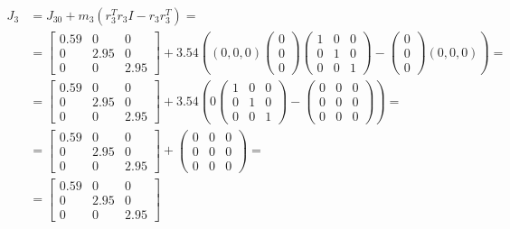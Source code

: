 \documentclass[a4paper]{article}
\begin{document}
	\begin{align*}
		J_3 &= J_{30} + m_3(r_3^Tr_3I-r_3r_3^T) =
		\\
		&= \begin{bmatrix}
			0.59 & 0 & 0 \\
			0 & 2.95 & 0 \\
			0 & 0 & 2.95
		\end{bmatrix} +
		3.54
		\left(
		(0, 0, 0)
		\begin{pmatrix}
			0 \\ 0 \\ 0
		\end{pmatrix}
		\begin{pmatrix}
			1 & 0 & 0 \\
			0 & 1 & 0 \\
			0 & 0 & 1
		\end{pmatrix}
		-
		\begin{pmatrix}
			0 \\ 0 \\ 0
		\end{pmatrix}
		(0, 0, 0)
		\right) =
		\\
		&= \begin{bmatrix}
			0.59 & 0 & 0 \\
			0 & 2.95 & 0 \\
			0 & 0 & 2.95
		\end{bmatrix} +
		3.54
		\left(
		0
		\begin{pmatrix}
			1 & 0 & 0 \\
			0 & 1 & 0 \\
			0 & 0 & 1
		\end{pmatrix}
		-
		\begin{pmatrix}
			0 & 0 & 0 \\
			0 & 0 & 0 \\
			0 & 0 & 0
		\end{pmatrix}
		\right) =
		\\
		&= \begin{bmatrix}
			0.59 & 0 & 0 \\
			0 & 2.95 & 0 \\
			0 & 0 & 2.95
		\end{bmatrix} +
		\begin{pmatrix}
			0 & 0 & 0 \\
			0 & 0 & 0 \\
			0 & 0 & 0
		\end{pmatrix}=
		\\
		&= \begin{bmatrix}
			0.59 & 0 & 0 \\
			0 & 2.95 & 0 \\
			0 & 0 & 2.95
		\end{bmatrix}
	\end{align*}
\end{document}
